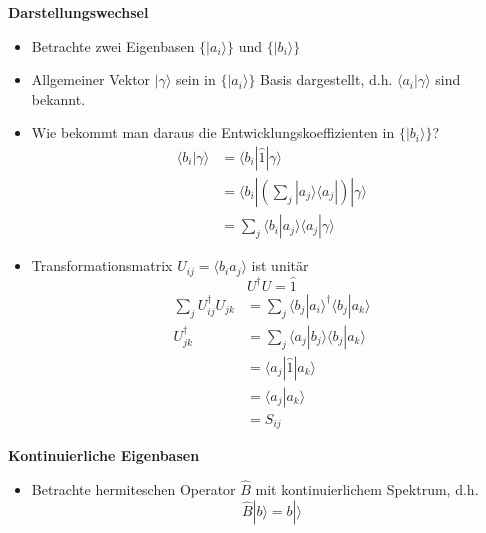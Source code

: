 \documentclass[10pt,article,colorback,accentcolor=tud9d]{scrartcl}
\begin{document}
\begin{fleqn}
\begin{itemize}
\end{itemize}
\textbf{Darstellungswechsel}
\begin{itemize}
	\item Betrachte zwei Eigenbasen $\{\left.\right|a_i\rangle\}$ und $\{\left.\right|b_i\rangle\}$
  \item Allgemeiner Vektor $\left.\right|\gamma\rangle$ sein in $\{\left.\right|a_i\rangle\}$ Basis dargestellt, d.h. $\langle a_i\left.\right|\gamma\rangle$ sind bekannt.
  \item Wie bekommt man daraus die Entwicklungskoeffizienten in $\{\left.\right|b_i\rangle\}$?
  \begin{equation}
  \begin{aligned}
    \langle b_i \left.\right|\gamma\rangle&=\langle b_i\left.\right|\hat{1}\left.\right|\gamma\rangle\\
    &=\langle b_i \left.\right|\left(\sum_j\left.\right|a_j\rangle\langle a_j\left.\right|\right)\left.\right|\gamma\rangle\\
    &=\sum_j\langle b_i\left.\right|a_j\rangle\langle a_j\left.\right|\gamma\rangle
  \end{aligned}
  \end{equation}
  \item Transformationsmatrix $U_{ij} =\langle b_ia_j\rangle$ ist unitär
    \begin{equation}
      U^{\dagger}U=\hat{1}
     \end{equation}
     \begin{equation}
      \begin{aligned}
      \sum_jU^{\dagger}_{ij}U_{jk}&=\sum_j\langle b_j\left.\right|a_i\rangle^{\dagger}\langle b_j\left.\right|a_k\rangle\\
      U_{jk}^{\dagger}&=\sum_j\langle a_j\left.\right|b_j\rangle\langle b_j\left.\right|a_k\rangle\\
      &=\langle a_j\left.\right|\hat{1}\left.\right|a_k\rangle\\
      &=\langle a_j\left.\right|a_k\rangle\\
      &=S_{ij}
      \end{aligned}
    \end{equation}
\end{itemize}
\textbf{Kontinuierliche Eigenbasen}
\begin{itemize}
	\item Betrachte hermiteschen Operator $\hat{B}$ mit kontinuierlichem Spektrum, d.h.
    \begin{equation}
    \hat{B}\left.\right|b\rangle =b\left.\right|\rangle

\end{equation}
\end{itemize}
\end{fleqn}
\end{document}
